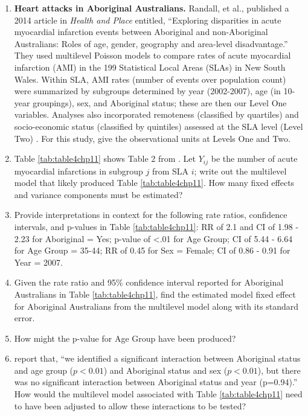 \documentclass[
]{krantz}
\begin{document}
\begin{enumerate}
\def\labelenumi{\arabic{enumi}.}
\setcounter{enumi}{18}
\item
  \textbf{Heart attacks in Aboriginal Australians.} Randall, et al., published a 2014 article in \emph{Health and Place} entitled, ``Exploring disparities in acute myocardial infarction events between Aboriginal and non-Aboriginal Australians: Roles of age, gender, geography and area-level disadvantage.'' They used multilevel Poisson models to compare rates of acute myocardial infarction (AMI) in the 199 Statistical Local Areas (SLAs) in New South Wales. Within SLA, AMI rates (number of events over population count) were summarized by subgroups determined by year (2002-2007), age (in 10-year groupings), sex, and Aboriginal status; these are then our Level One variables. Analyses also incorporated remoteness (classified by quartiles) and socio-economic status (classified by quintiles) assessed at the SLA level (Level Two) \citep{Randall2014}. For this study, give the observational units at Levels One and Two.
\item
  Table \ref{tab:table4chp11} shows Table 2 from \citet{Randall2014}. Let \(Y_{ij}\) be the number of acute myocardial infarctions in subgroup \(j\) from SLA \(i\); write out the multilevel model that likely produced Table \ref{tab:table4chp11}. How many fixed effects and variance components must be estimated?
\item
  Provide interpretations in context for the following rate ratios, confidence intervals, and p-values in Table \ref{tab:table4chp11}: RR of 2.1 and CI of 1.98 - 2.23 for Aboriginal = Yes; p-value of \textless.01 for Age Group; CI of 5.44 - 6.64 for Age Group = 35-44; RR of 0.45 for Sex = Female; CI of 0.86 - 0.91 for Year = 2007.
\item
  Given the rate ratio and 95\% confidence interval reported for Aboriginal Australians in Table \ref{tab:table4chp11}, find the estimated model fixed effect for Aboriginal Australians from the multilevel model along with its standard error.
\item
  How might the p-value for Age Group have been produced?
\item
  \citet{Randall2014} report that, ``we identified a significant interaction between Aboriginal status and age group (\(p<0.01\)) and Aboriginal status and sex (\(p<0.01\)), but there was no significant interaction between Aboriginal status and year (p=0.94).'' How would the multilevel model associated with Table \ref{tab:table4chp11} need to have been adjusted to allow these interactions to be tested?
\end{enumerate}
\end{document}
